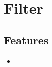 \section{Filter}
\label{module:Filter}
\ClearAPI
\TODO
\subsection{Features}
\begin{itemize}
	\item \TODO
\end{itemize}

